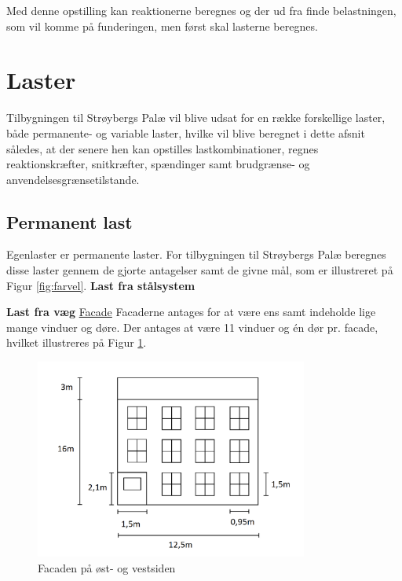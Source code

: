 Med denne opstilling kan reaktionerne beregnes og der ud fra finde belastningen, som vil komme på funderingen, men først skal lasterne beregnes.

\section{Laster}
Tilbygningen til Strøybergs Palæ vil blive udsat for en række forskellige laster, både permanente- og variable laster, hvilke vil blive beregnet i dette afsnit således, at der senere hen kan opstilles lastkombinationer, regnes reaktionskræfter, snitkræfter, spændinger samt brudgrænse- og anvendelsesgrænsetilstande.

\subsection{Permanent last}
Egenlaster er permanente laster. For tilbygningen til Strøybergs Palæ beregnes disse laster gennem de gjorte antagelser samt de givne mål, som er illustreret på Figur \ref{fig:farvel}.
\newline
\newline
\textbf{Last fra stålsystem}
\newline

\newline
\newline
\textbf{Last fra væg}
\newline
\newline
\underline{Facade}
\newline
Facaderne antages for at være ens samt indeholde lige mange vinduer og døre. Der antages at være 11 vinduer og én dør pr. facade, hvilket illustreres på Figur \ref{fig:facade}.

\begin{figure}[htbp]
	\centering
	\includegraphics[width=0.8\textwidth]{billeder/facadenord.png}
	\caption{Facaden på øst- og vestsiden}
	\label{fig:facade}
\end{figure}
 
